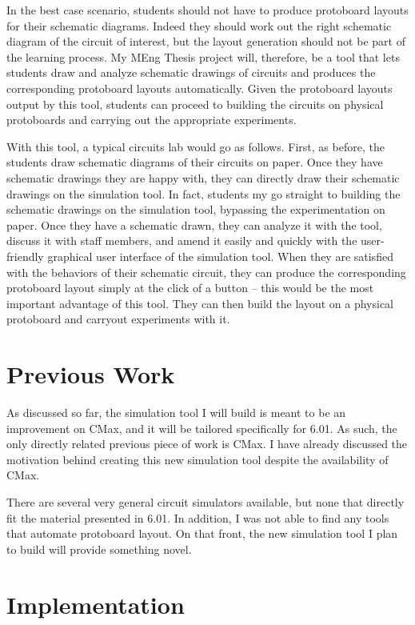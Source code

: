 \documentclass[12pt, doublespacing]{amsart}
\begin{document}
In the best case scenario, students should not have to produce protoboard layouts for their schematic diagrams. Indeed they should work out the right schematic diagram of the circuit of interest, but the layout generation should not be part of the learning process. My MEng Thesis project will, therefore, be a tool that lets students draw and analyze schematic drawings of circuits and produces the corresponding protoboard layouts automatically. Given the protoboard layouts output by this tool, students can proceed to building the circuits on physical protoboards and carrying out the appropriate experiments.

With this tool, a typical circuits lab would go as follows. First, as before, the students draw schematic diagrams of their circuits on paper. Once they have schematic drawings they are happy with, they can directly draw their schematic drawings on the simulation tool. In fact, students my go straight to building the schematic drawings on the simulation tool, bypassing the experimentation on paper. Once they have a schematic drawn, they can analyze it with the tool, discuss it with staff members, and amend it easily and quickly with the user-friendly graphical user interface of the simulation tool. When they are satisfied with the behaviors of their schematic circuit, they can produce the corresponding protoboard layout simply at the click of a button -- this would be the most important advantage of this tool. They can then build the layout on a physical protoboard and carryout experiments with it.

\section{Previous Work}
\label{sec:previouswork}

As discussed so far, the simulation tool I will build is meant to be an improvement on CMax, and it will be tailored specifically for 6.01. As such, the only directly related previous piece of work is CMax. I have already discussed the motivation behind creating this new simulation tool despite the availability of CMax.

There are several very general circuit simulators available, but none that directly fit the material presented in 6.01. In addition, I was not able to find any tools that automate protoboard layout. On that front, the new simulation tool I plan to build will provide something novel.

\section{Implementation}
\label{sec:implementation}
\end{document}
